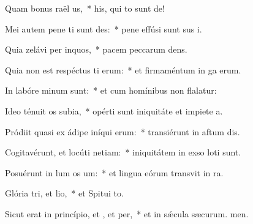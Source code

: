 \item Quam bonus raël us,~* his, qui to sunt de!
\item Mei autem pene ti sunt des:~* pene effúsi sunt sus i.
\item Quia zelávi per inquos,~* pacem peccarum dens.
\item Quia non est respéctus ti erum:~* et firmaméntum in ga erum.
\item In labóre minum  sunt:~* et cum homínibus non flalatur:
\item Ideo ténuit os subia,~* opérti sunt iniquitáte et impiete a.
\item Pródiit quasi ex ádipe iníqui erum:~* transiérunt in aftum dis.
\item Cogitavérunt, et locúti  netiam:~* iniquitátem in exso loti sunt.
\item Posuérunt in lum os um:~* et lingua eórum transvit in ra.
\item Glória tri, et lio,~* et Spitui to.
\item Sicut erat in princípio, et , et per,~* et in sǽcula sæcurum. men.
